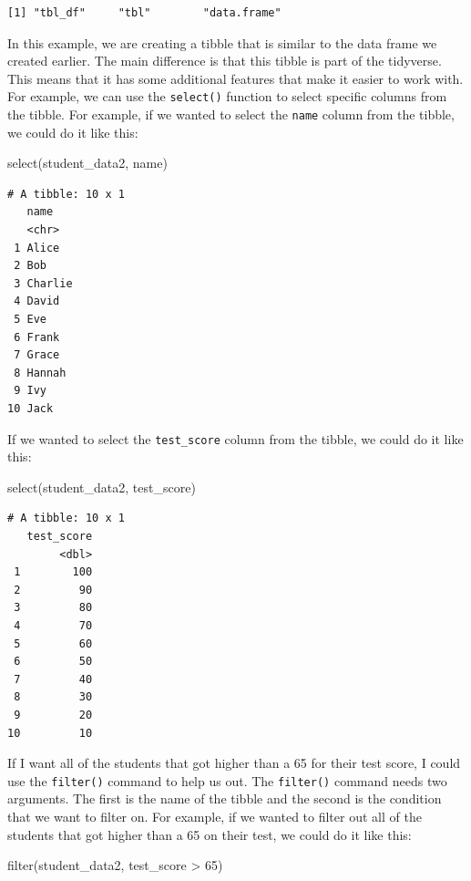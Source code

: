 \documentclass[
  letterpaper,
  DIV=11,
  numbers=noendperiod]{scrreprt}
\newenvironment{Shaded}{\begin{snugshade}}{\end{snugshade}}
\newcommand{\DecValTok}[1]{\textcolor[rgb]{0.68,0.00,0.00}{#1}}
\newcommand{\FunctionTok}[1]{\textcolor[rgb]{0.28,0.35,0.67}{#1}}
\newcommand{\NormalTok}[1]{\textcolor[rgb]{0.00,0.23,0.31}{#1}}
\newcommand{\SpecialCharTok}[1]{\textcolor[rgb]{0.37,0.37,0.37}{#1}}
\begin{document}
\begin{verbatim}
[1] "tbl_df"     "tbl"        "data.frame"
\end{verbatim}

In this example, we are creating a tibble that is similar to the data
frame we created earlier. The main difference is that this tibble is
part of the tidyverse. This means that it has some additional features
that make it easier to work with. For example, we can use the
\texttt{select()} function to select specific columns from the tibble.
For example, if we wanted to select the \texttt{name} column from the
tibble, we could do it like this:

\begin{Shaded}
\begin{Highlighting}[]
\FunctionTok{select}\NormalTok{(student\_data2, name)}
\end{Highlighting}
\end{Shaded}

\begin{verbatim}
# A tibble: 10 x 1
   name   
   <chr>  
 1 Alice  
 2 Bob    
 3 Charlie
 4 David  
 5 Eve    
 6 Frank  
 7 Grace  
 8 Hannah 
 9 Ivy    
10 Jack   
\end{verbatim}

If we wanted to select the \texttt{test\_score} column from the tibble,
we could do it like this:

\begin{Shaded}
\begin{Highlighting}[]
\FunctionTok{select}\NormalTok{(student\_data2, test\_score)}
\end{Highlighting}
\end{Shaded}

\begin{verbatim}
# A tibble: 10 x 1
   test_score
        <dbl>
 1        100
 2         90
 3         80
 4         70
 5         60
 6         50
 7         40
 8         30
 9         20
10         10
\end{verbatim}

If I want all of the students that got higher than a 65 for their test
score, I could use the \texttt{filter()} command to help us out. The
\texttt{filter()} command needs two arguments. The first is the name of
the tibble and the second is the condition that we want to filter on.
For example, if we wanted to filter out all of the students that got
higher than a 65 on their test, we could do it like this:

\begin{Shaded}
\begin{Highlighting}[]
\FunctionTok{filter}\NormalTok{(student\_data2, test\_score }\SpecialCharTok{\textgreater{}} \DecValTok{65}\NormalTok{)}
\end{Highlighting}
\end{Shaded}
\end{document}

